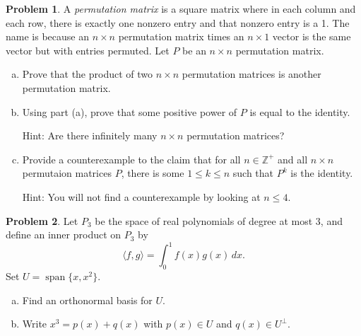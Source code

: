 \documentclass[11pt,oneside]{amsart}
\theoremstyle{definition}
\newtheorem{problem}{Problem}
\newcommand{\bZ}{\mathbb{Z}}
\DeclareMathOperator{\Span}{span}
\begin{document}
    \begin{problem}
        A \emph{permutation matrix} is a square matrix where in each column and each row, there is exactly one nonzero entry and that nonzero entry is a 1. The name is because an $n\times n$ permutation matrix times an $n\times 1$ vector is the same vector but with entries permuted. Let $P$ be an $n\times n$ permutation matrix.
        \begin{enumerate}[(a)]
            \item Prove that the product of two $n\times n$ permutation matrices is another permutation matrix.
            \item Using part (a), prove that some positive power of $P$ is equal to the identity.
            
            Hint: Are there infinitely many $n\times n$ permutation matrices?
            \item Provide a counterexample to the claim that for all $n\in\bZ^+$ and all $n\times n$ permutaion matrices $P$, there is some $1\leq k\leq n$ such that $P^k$ is the identity.
            
            Hint: You will not find a counterexample by looking at $n\leq 4$.
        \end{enumerate}
    \end{problem}

    \begin{problem}
        Let $P_3$ be the space of real polynomials of degree at most 3, and define an inner product on $P_3$ by
        \[\langle f,g\rangle=\int_0^1 f(x)g(x)\,dx.\]
        Set $U=\Span\{x,x^2\}$.
        \begin{enumerate}[(a)]
            \item Find an orthonormal basis for $U$.
            \item Write $x^3=p(x)+q(x)$ with $p(x)\in U$ and $q(x)\in U^\perp$.
        \end{enumerate}
    \end{problem}
\end{document}
